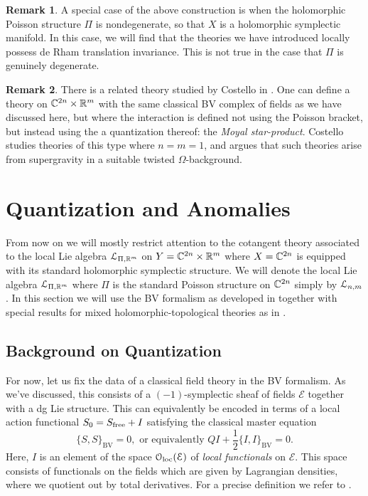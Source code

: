 \documentclass[11pt, oneside, reqno]{amsart}
\theoremstyle{definition} \newtheorem{definition}{Definition}[section]
\theoremstyle{definition}
\theoremstyle{remark}
\theoremstyle{definition} \newtheorem{remark}[definition]{Remark}
\theoremstyle{definition} \newtheorem{remarks}[definition]{Remarks}
\theoremstyle{definition} \newtheorem{question}[definition]{Question}
\theoremstyle{definition} \newtheorem*{note}{Note}
\theoremstyle{definition} \newtheorem{example}[definition]{Example}
\theoremstyle{definition} \newtheorem{examples}[definition]{Examples}
\def\oloc{\mathcal{O}_{\rm loc}}
\def\cE{\mathcal E}\def\cF{\mathcal F}\def\cG{\mathcal G}\def\cH{\mathcal H}
\newcommand{\mr}[1]{\mathrm{#1}}
\newcommand{\mc}[1]{\mathcal{#1}}
\begin{document}
\begin{remark}
A special case of the above construction is when the holomorphic Poisson structure $\Pi$ is nondegenerate, so that $X$ is a holomorphic symplectic manifold. 
In this case, we will find that the theories we have introduced locally possess de Rham translation invariance.
This is not true in the case that $\Pi$ is genuinely degenerate.
\end{remark}

\begin{remark}
There is a related theory studied by Costello in \cite{CostelloM2}.  One can define a theory on $\mathbb C^{2n} \times \mathbb R^m$ with the same classical BV complex of fields as we have discussed here, but where the interaction is defined not using the Poisson bracket, but instead using the a quantization thereof: the \emph{Moyal star-product}.  Costello studies theories of this type where $n=m=1$, and argues that such theories arise from supergravity in a suitable twisted $\Omega$-background.
\end{remark}

\section{Quantization and Anomalies} \label{sec:quantization}

From now on we will mostly restrict attention to the cotangent theory associated to the local Lie algebra $\mc L_{\Pi,\RR^m}$ on $Y = \mathbb C^{2n} \times \mathbb R^m$ where $X = \mathbb C^{2n}$ is equipped with its standard holomorphic symplectic structure.  
We will denote the local Lie algebra $\mc L_{\Pi,\RR^m}$ where $\Pi$ is the standard Poisson structure on $\mathbb C^{2n}$ simply by $\mathcal L_{n,m}$.  
In this section we will use the BV formalism as developed in \cite{CostelloBook, Book2} together with special results for mixed holomorphic-topological theories as in \cite{BWhol, GWcs, GWR}.

\subsection{Background on Quantization} \label{sec:renorm}

For now, let us fix the data of a classical field theory in the BV formalism. 
As we've discussed, this consists of a $(-1)$-symplectic sheaf of fields $\cE$ together with a dg Lie structure.  This can equivalently be encoded in terms of a local action functional $S_0 = S_{\rm free} + I$ satisfying the classical master equation
\[
\{S, S\}_{\mr{BV}} = 0, \text{ or equivalently } Q I + \frac 12 \{I, I\}_{\mr{BV}} = 0 .
\]
Here, $I$ is an element of the space $\oloc(\cE)$ of {\em local functionals} on $\cE$. 
This space consists of functionals on the fields which are given by Lagrangian densities, where we quotient out by total derivatives.
For a precise definition we refer to \cite[Definition 3.5.1.1]{Book2}. 
\end{document}
